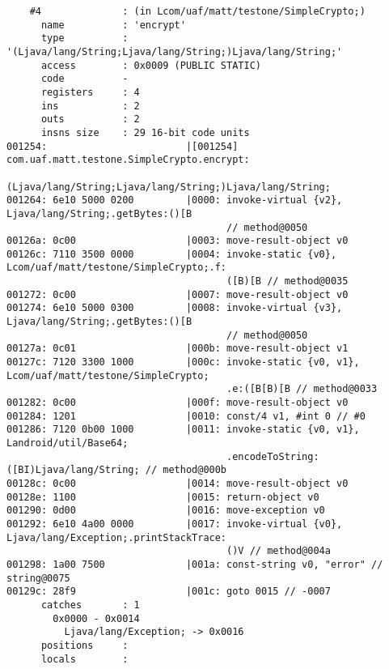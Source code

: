 \begin{lstlisting}
    #4              : (in Lcom/uaf/matt/testone/SimpleCrypto;)
      name          : 'encrypt'
      type          : '(Ljava/lang/String;Ljava/lang/String;)Ljava/lang/String;'
      access        : 0x0009 (PUBLIC STATIC)
      code          -
      registers     : 4
      ins           : 2
      outs          : 2
      insns size    : 29 16-bit code units
001254:                        |[001254] com.uaf.matt.testone.SimpleCrypto.encrypt:
                                         (Ljava/lang/String;Ljava/lang/String;)Ljava/lang/String;
001264: 6e10 5000 0200         |0000: invoke-virtual {v2}, Ljava/lang/String;.getBytes:()[B
                                      // method@0050
00126a: 0c00                   |0003: move-result-object v0
00126c: 7110 3500 0000         |0004: invoke-static {v0}, Lcom/uaf/matt/testone/SimpleCrypto;.f:
                                      ([B)[B // method@0035
001272: 0c00                   |0007: move-result-object v0
001274: 6e10 5000 0300         |0008: invoke-virtual {v3}, Ljava/lang/String;.getBytes:()[B
                                      // method@0050
00127a: 0c01                   |000b: move-result-object v1
00127c: 7120 3300 1000         |000c: invoke-static {v0, v1}, Lcom/uaf/matt/testone/SimpleCrypto;
                                      .e:([B[B)[B // method@0033
001282: 0c00                   |000f: move-result-object v0
001284: 1201                   |0010: const/4 v1, #int 0 // #0
001286: 7120 0b00 1000         |0011: invoke-static {v0, v1}, Landroid/util/Base64;
                                      .encodeToString:([BI)Ljava/lang/String; // method@000b
00128c: 0c00                   |0014: move-result-object v0
00128e: 1100                   |0015: return-object v0
001290: 0d00                   |0016: move-exception v0
001292: 6e10 4a00 0000         |0017: invoke-virtual {v0}, Ljava/lang/Exception;.printStackTrace:
                                      ()V // method@004a
001298: 1a00 7500              |001a: const-string v0, "error" // string@0075
00129c: 28f9                   |001c: goto 0015 // -0007
      catches       : 1
        0x0000 - 0x0014
          Ljava/lang/Exception; -> 0x0016
      positions     :
      locals        :


\end{lstlisting}
